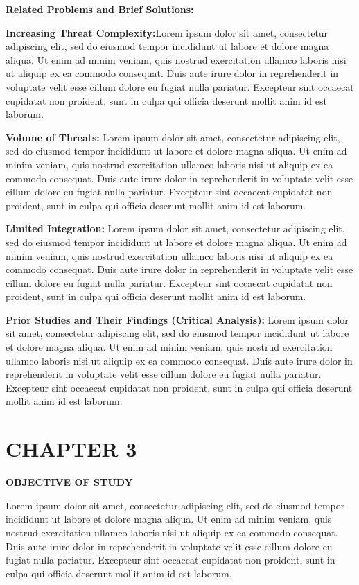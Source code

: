 \documentclass[12pt]{article}
\newcommand{\centersection}[1]{%
  \begin{center}
    \fontfamily{ptm}\fontsize{14}{16}\selectfont\bfseries\uppercase{#1}
  \end{center}
}
\begin{document}
\textbf{Related Problems and Brief Solutions:}

\textbf{Increasing Threat Complexity:}Lorem ipsum dolor sit amet, consectetur adipiscing elit, sed do eiusmod tempor incididunt ut labore et dolore magna aliqua. Ut enim ad minim veniam, quis nostrud exercitation ullamco laboris nisi ut aliquip ex ea commodo consequat. Duis aute irure dolor in reprehenderit in voluptate velit esse cillum dolore eu fugiat nulla pariatur. Excepteur sint occaecat cupidatat non proident, sunt in culpa qui officia deserunt mollit anim id est laborum.

\textbf{Volume of Threats:} Lorem ipsum dolor sit amet, consectetur adipiscing elit, sed do eiusmod tempor incididunt ut labore et dolore magna aliqua. Ut enim ad minim veniam, quis nostrud exercitation ullamco laboris nisi ut aliquip ex ea commodo consequat. Duis aute irure dolor in reprehenderit in voluptate velit esse cillum dolore eu fugiat nulla pariatur. Excepteur sint occaecat cupidatat non proident, sunt in culpa qui officia deserunt mollit anim id est laborum.

\textbf{Limited Integration:} Lorem ipsum dolor sit amet, consectetur adipiscing elit, sed do eiusmod tempor incididunt ut labore et dolore magna aliqua. Ut enim ad minim veniam, quis nostrud exercitation ullamco laboris nisi ut aliquip ex ea commodo consequat. Duis aute irure dolor in reprehenderit in voluptate velit esse cillum dolore eu fugiat nulla pariatur. Excepteur sint occaecat cupidatat non proident, sunt in culpa qui officia deserunt mollit anim id est laborum.

\textbf{Prior Studies and Their Findings (Critical Analysis):} Lorem ipsum dolor sit amet, consectetur adipiscing elit, sed do eiusmod tempor incididunt ut labore et dolore magna aliqua. Ut enim ad minim veniam, quis nostrud exercitation ullamco laboris nisi ut aliquip ex ea commodo consequat. Duis aute irure dolor in reprehenderit in voluptate velit esse cillum dolore eu fugiat nulla pariatur. Excepteur sint occaecat cupidatat non proident, sunt in culpa qui officia deserunt mollit anim id est laborum.

\newpage %
\section*{CHAPTER 3}
\centersection{OBJECTIVE OF STUDY}
\fontsize{12}{14}\selectfont
Lorem ipsum dolor sit amet, consectetur adipiscing elit, sed do eiusmod tempor incididunt ut labore et dolore magna aliqua. Ut enim ad minim veniam, quis nostrud exercitation ullamco laboris nisi ut aliquip ex ea commodo consequat. Duis aute irure dolor in reprehenderit in voluptate velit esse cillum dolore eu fugiat nulla pariatur. Excepteur sint occaecat cupidatat non proident, sunt in culpa qui officia deserunt mollit anim id est laborum.
\end{document}
